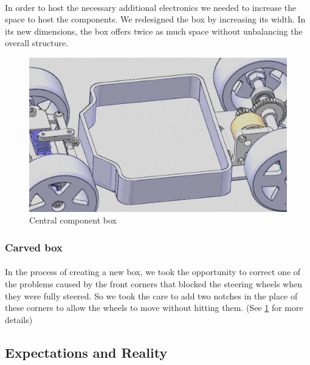 \paragraph{}
In order to host the necessary additional electronics we needed to increase the
space to host the components. We redesigned the box by increasing its width.
In its new dimensions, the box offers twice as much space without unbalancing
the overall structure.

\begin{figure}[!ht]
    \begin{center}
        \includegraphics[scale=0.45]{Images/kart_central_box.png}
    \end{center}
    \caption{Central component box}
    \label{fig:central_box}
\end{figure}

\subsubsection{Carved box}
\paragraph{}

In the process of creating a new box, we took the opportunity to correct one
of the problems caused by the front corners that blocked the steering wheels
when they were fully steered. So we took the care to add two notches in
the place of these corners to allow the wheels to move without hitting them.
(See \ref{fig:central_box} for more details)

\subsection{Expectations and Reality}
